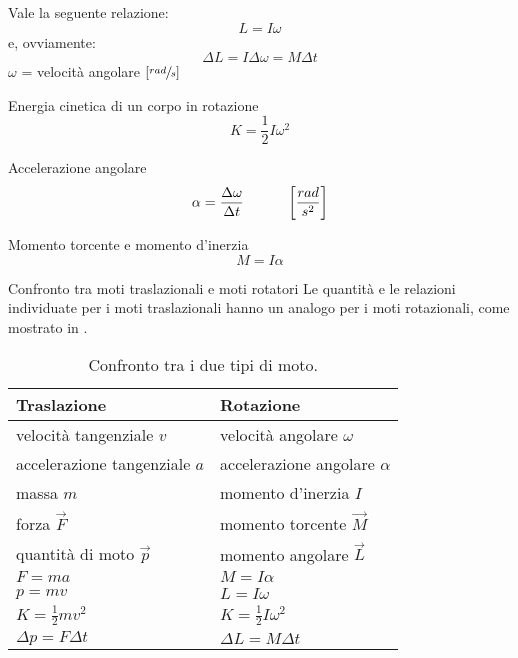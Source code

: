 \documentclass[a4paper,11pt,italian]{article}
\begin{document}
\begin{description}
\begin{soloscientifico}
  Vale la seguente relazione:
  \[ L = I\omega \]
  e, ovviamente:
  \[ \Delta L = I\Delta\omega = M \Delta t \]
  $ \omega $ = velocità angolare $ [\sfrac{rad}{s}] $
  
  \item[Energia cinetica di un corpo in rotazione]
  \[ K = \frac{1}{2}I\omega^2 \]
  
  \item[Accelerazione angolare]
  \[ \alpha = \frac{\Delta \omega}{\Delta t} \hspace*{3em} \left[ \frac{rad}{s^2} \right] \]
  
  \item[Momento torcente e momento d'inerzia]
  \[ M = I \alpha \]
  
  \item[Confronto tra moti traslazionali e moti rotatori] 
  Le quantità e le relazioni individuate per i moti traslazionali hanno un analogo per i moti rotazionali, come mostrato in .

  \begin{table}[htp]\centering
    \begin{tabular}{ll}\toprule
     \textbf{Traslazione} & \textbf{Rotazione} \\\midrule
     velocità tangenziale $ v $ & velocità angolare $ \omega $ \\\addlinespace[.2em]
     accelerazione tangenziale $ a $ & accelerazione angolare $ \alpha $\\\addlinespace[.2em]
     massa $ m $ & momento d'inerzia $ I $\\\addlinespace[.2em]
     forza $ \vec{F} $ & momento torcente $ \vec{M} $\\\addlinespace[.2em]
     quantità di moto $ \vec{p} $ & momento angolare $ \vec{L} $\\\addlinespace[.2em]
     $ F = ma $ & $ M = I \alpha  $ \\\addlinespace[.2em]
     $ p = mv $ & $ L = I \omega  $ \\\addlinespace[.2em]
     $ K = \frac{1}{2}mv^2 $ & $ K = \frac{1}{2} I\omega^2 $ \\\addlinespace[.2em]
     $ \Delta p = F\Delta t $ & $ \Delta L = M\Delta t $\\\bottomrule
    \end{tabular}
    \caption{Confronto tra i due tipi di moto.}
    \label{tab:traslazionalirotazionali}
  \end{table}  
\end{soloscientifico}   %
\end{description}
\end{document}
